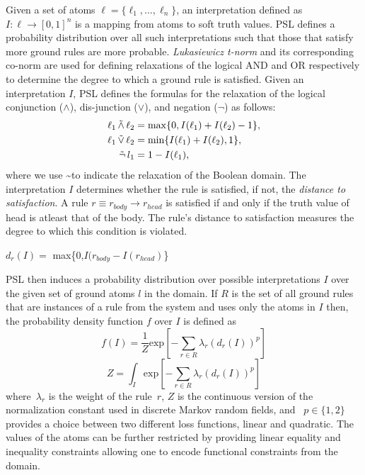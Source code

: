 Given a set of atoms 
$\ell = \{\ell_1,\ldots,\ell_n\}$,
an interpretation defined as 
$I : \ell \rightarrow [0,1]^n$
is a mapping from atoms to soft truth values.
PSL defines a probability distribution over all such interpretations such that those that satisfy more ground rules are more probable.
\emph{Lukasiewicz t-norm} and its corresponding co-norm are used for defining relaxations of the logical AND and OR respectively to determine the degree to which a ground rule is satisfied.
Given an interpretation $\mathit{I}$, PSL defines the formulas for the relaxation of the logical conjunction ($\wedge$), dis-junction ($\vee$), and negation ($\neg$) as follows:
\begin{align*}
\ell_1 \softand \ell_2 &= \max\{0, I(\ell_1) + I(\ell_2) - 1\},\\
\ell_1 \softor \ell_2 &= \min\{I(\ell_1) + I(\ell_2), 1\},\\
\softneg l_1 &= 1 - I(\ell_1),
\end{align*}  
where we use \textasciitilde to indicate the relaxation of the Boolean domain.
The interpretation $\mathit{I}$ determines whether the rule is satisfied, if not, the \emph{distance to satisfaction}.
A rule $\mathit{r} \equiv \mathit{r_{body}} \rightarrow \mathit{r_{head}} $  is satisfied if and only if the truth value of head is atleast that of the body. The rule's distance to satisfaction measures the degree to which this condition is violated.
\begin{center} 
 $\mathit{d_r}(\mathit{I}) =$ max\{0,$\mathit{I(r_{body}} - \mathit{I(r_{head})}$\}
 \end{center}
PSL then induces a probability distribution over possible interpretations $\mathit{I}$ over the given set of ground atoms $\mathit{l} $ in the domain. 
If $\mathit{R}$ is the set of all ground rules that are instances of a rule from the system and uses only the atoms in  $\mathit{I}$ then,
the probability density function $\mathit{f}$ over $\mathit{I}$ is defined as
\begin{equation}
\label{eq:contimn1}
    f (I) = \frac{1}{Z} \text{exp}[-\sum_{r\in R} \lambda_r (d_r(I))^p]
\end{equation}
\begin{equation}
\label{eq:contimn2}
	Z = \int_{I} \text{exp} [ -\sum_{r\in R} \lambda_r (d_r(I))^p ]
\end{equation}
where~$\lambda_r$ is the weight of the rule~$r$, $Z$ is the continuous version of the normalization constant used in discrete Markov random fields, and ~$p \in \{1, 2\}$ provides a choice between two different loss functions, linear and quadratic.
The values of the atoms can be further restricted by providing linear equality and inequality constraints allowing one to encode functional constraints from the domain.

